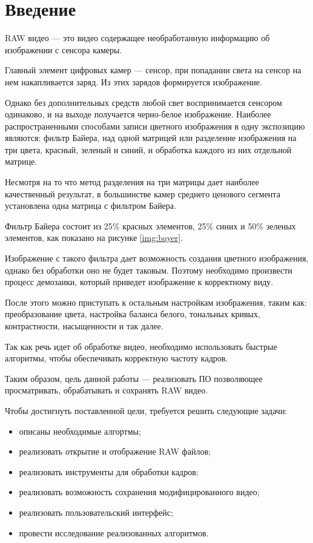 \chapter*{Введение}

RAW видео --- это видео содержащее необработанную информацию об изображении с сенсора камеры.

Главный элемент цифровых камер --- сенсор, при попадании света на сенсор на нем накапливается заряд. Из этих зарядов формируется изображение.

Однако без дополнительных средств любой свет воспринимается сенсором одинаково, и на выходе получается черно-белое изображение. Наиболее распространенными способами записи цветного изображения в одну экспозицию являются: фильтр Байера, над одной матрицей или разделение изображения на три цвета, красный, зеленый и синий, и обработка каждого из них отдельной матрице. \cite{color}

Несмотря на то что метод разделения на три матрицы дает наиболее качественный результат, в большинстве камер среднего ценового сегмента установлена одна матрица с фильтром Байера.

Фильтр Байера состоит из 25\% красных элементов, 25\% синих и 50\% зеленых элементов, как показано на рисунке \ref{img:bayer}.


Изображение с такого фильтра дает возможность создания цветного изображения, однако без обработки оно не будет таковым. Поэтому необходимо произвести процесс демозаики, который приведет изображение к корректному виду. 

После этого можно приступать к остальным настройкам изображения, таким как: преобразование цвета, настройка баланса белого, тональных кривых, контрастности, насыщенности и так далее.

Так как речь идет об обработке видео, необходимо использовать быстрые алгоритмы, чтобы обеспечивать корректную частоту кадров.
 
Таким образом, цель данной работы --- реализовать ПО позволяющее просматривать, обрабатывать и сохранять RAW видео.

Чтобы достигнуть поставленной цели, требуется решить следующие задачи:
\begin{itemize}
	\item описаны необходимые алгортмы;
	\item реализовать открытие и отображение RAW файлов;
	\item реализовать инструменты для обработки кадров;
	\item реализовать возможность сохранения модифицированного видео;
	\item реализовать пользовательский интерфейс;
	\item провести исследование реализованных алгоритмов.
\end{itemize}

